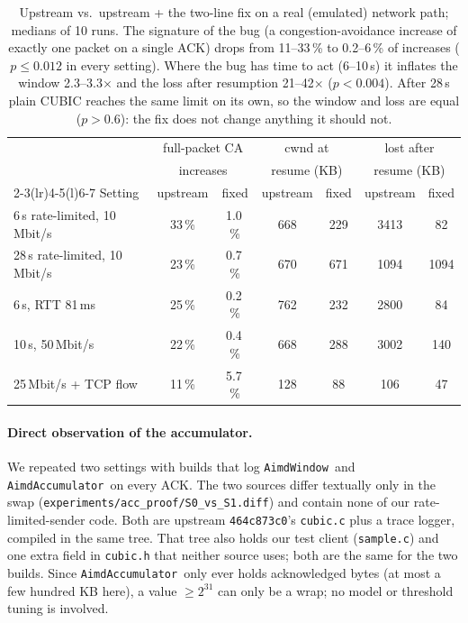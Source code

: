 \documentclass[11pt,a4paper]{article}
\newcommand{\acc}{\texttt{AimdAccumulator}}
\newcommand{\aw}{\texttt{AimdWindow}}
\begin{document}
\begin{table}[H]
\centering\footnotesize
\setlength{\tabcolsep}{4pt}
\begin{tabular}{@{}lcccccc@{}}
\toprule
 & \multicolumn{2}{c}{full-packet CA} & \multicolumn{2}{c}{cwnd at} & \multicolumn{2}{c}{lost after} \\
 & \multicolumn{2}{c}{increases} & \multicolumn{2}{c}{resume (KB)} & \multicolumn{2}{c}{resume (KB)} \\
\cmidrule(lr){2-3}\cmidrule(lr){4-5}\cmidrule(l){6-7}
Setting & upstream & fixed & upstream & fixed & upstream & fixed \\
\midrule
6\,s rate-limited, 10\,Mbit/s & 33\,\% & 1.0\,\% & 668 & 229 & 3413 & 82 \\
28\,s rate-limited, 10\,Mbit/s & 23\,\% & 0.7\,\% & 670 & 671 & 1094 & 1094 \\
6\,s, RTT 81\,ms & 25\,\% & 0.2\,\% & 762 & 232 & 2800 & 84 \\
10\,s, 50\,Mbit/s & 22\,\% & 0.4\,\% & 668 & 288 & 3002 & 140 \\
25\,Mbit/s + TCP flow & 11\,\% & 5.7\,\% & 128 & 88 & 106 & 47 \\
\bottomrule
\end{tabular}
\caption{Upstream vs.\ upstream + the two-line fix on a real (emulated) network
  path; medians of 10 runs. The signature of the bug (a congestion-avoidance
  increase of exactly one packet on a single ACK) drops from 11--33\,\% to
  0.2--6\,\% of increases ($p \le 0.012$ in every setting). Where the bug has
  time to act (6--10\,s) it inflates the window 2.3--3.3$\times$ and the loss
  after resumption 21--42$\times$ ($p < 0.004$). After 28\,s plain CUBIC
  reaches the same limit on its own, so the window and loss are equal
  ($p > 0.6$): the fix does not change anything it should not.}
\end{table}

\paragraph{Direct observation of the accumulator.}
We repeated two settings with builds that log \aw\ and \acc\ on every ACK.
The two sources differ textually only in the swap
(\texttt{experiments/acc\_proof/S0\_vs\_S1.diff}) and contain none of our
rate-limited-sender code. Both are upstream \texttt{464c873c0}'s
\texttt{cubic.c} plus a trace logger, compiled in the same tree. That tree
also holds our test client (\texttt{sample.c}) and one extra field in
\texttt{cubic.h} that neither source uses; both are the same for the two
builds. Since \acc\ only ever holds acknowledged bytes
(at most a few hundred KB here), a value $\ge 2^{31}$ can only be a wrap; no
model or threshold tuning is involved.
\end{document}
